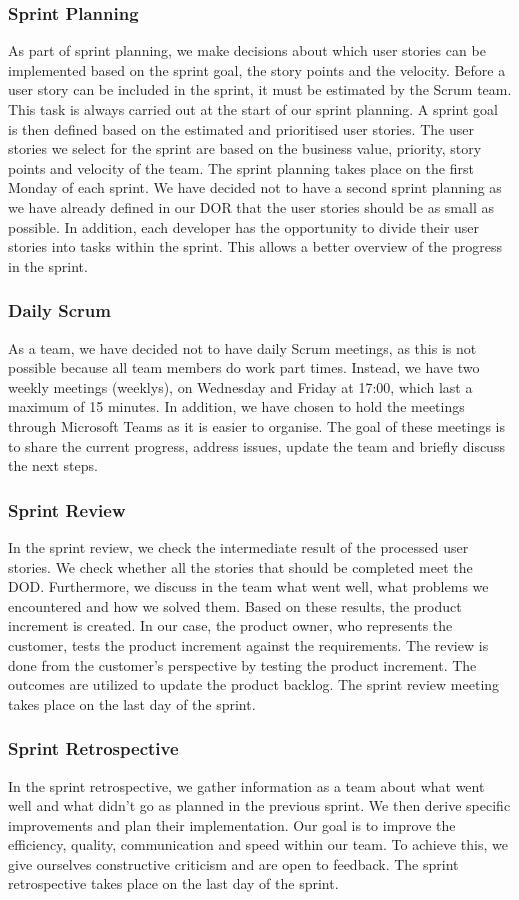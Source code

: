 \subsubsection{Sprint Planning}
As part of sprint planning, we make decisions about which user stories can be implemented based on the sprint goal, the story points and the velocity.
Before a user story can be included in the sprint, it must be estimated by the Scrum team. This task is always carried out at the start of our sprint planning.
A sprint goal is then defined based on the estimated and prioritised user stories.
The user stories we select for the sprint are based on the business value, priority, story points and velocity of the team.
The sprint planning takes place on the first Monday of each sprint.
We have decided not to have a second sprint planning as we have already defined in our DOR that the user stories should be as small as possible. In addition, each developer has the opportunity to divide their user stories into tasks within the sprint. This allows a better overview of the progress in the sprint.

\subsubsection{Daily Scrum}
As a team, we have decided not to have daily Scrum meetings, as this is not possible because all team members do work part times. Instead, we have two weekly meetings (weeklys), on Wednesday and Friday at 17:00, which last a maximum of 15 minutes.
In addition, we have chosen to hold the meetings through Microsoft Teams as it is easier to organise.
The goal of these meetings is to share the current progress, address issues, update the team and briefly discuss the next steps.

\subsubsection{Sprint Review}
In the sprint review, we check the intermediate result of the processed user stories. We check whether all the stories that should be completed meet the DOD. Furthermore, we discuss in the team what went well, what problems we encountered and how we solved them. Based on these results, the product increment is created.
In our case, the product owner, who represents the customer, tests the product increment against the requirements. The review is done from the customer's perspective by testing the product increment. The outcomes are utilized to update the product backlog.
The sprint review meeting takes place on the last day of the sprint.

\subsubsection{Sprint Retrospective}
In the sprint retrospective, we gather information as a team about what went well and what didn't go as planned in the previous sprint.
We then derive specific improvements and plan their implementation. Our goal is to improve the efficiency, quality, communication and speed within our team. To achieve this, we give ourselves constructive criticism and are open to feedback.
The sprint retrospective takes place on the last day of the sprint.